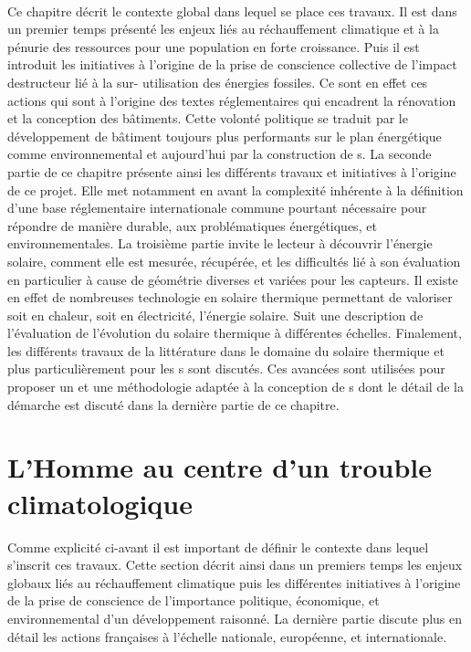\paragraph{} %
Ce chapitre décrit le contexte global dans lequel se place ces travaux. Il est dans un
premier temps présenté les enjeux liés au réchauffement climatique et à la pénurie des
ressources pour une population en forte croissance. Puis il est introduit les initiatives
à l’origine de la prise de conscience collective de l’impact destructeur lié à la sur-
utilisation des énergies fossiles. Ce sont en effet ces actions qui sont à l’origine des
textes réglementaires qui encadrent la rénovation et la conception des bâtiments. Cette
volonté politique se traduit par le développement de bâtiment toujours plus performants
sur le plan énergétique comme environnemental et aujourd’hui par la construction de
s. La seconde partie de ce chapitre présente ainsi les différents travaux et
initiatives à l’origine de ce projet. Elle met notamment en avant la complexité inhérente
à la définition d’une base réglementaire internationale commune pourtant nécessaire pour
répondre de manière durable, aux problématiques énergétiques, et environnementales. La
troisième partie invite le lecteur à découvrir l’énergie solaire, comment elle est
mesurée, récupérée, et les difficultés lié à son évaluation en particulier à cause de
géométrie diverses et variées pour les capteurs. Il existe en effet de nombreuses
technologie en solaire thermique permettant de valoriser soit en chaleur, soit en
électricité, l’énergie solaire. Suit une description de l’évaluation de l’évolution du
solaire thermique à différentes échelles. Finalement, les différents travaux de la
littérature dans le domaine du solaire thermique et plus particulièrement pour les
s sont discutés. Ces avancées sont utilisées pour proposer un  et une
méthodologie adaptée à la conception de s dont le détail de la démarche est
discuté dans la dernière partie de ce chapitre.



\section{L’Homme au centre d’un trouble climatologique} %
\label{sec:l_homme_au_centre_d_un_trouble_climatologique}
Comme explicité ci-avant il est important de définir le contexte dans lequel s’inscrit ces
travaux. Cette section décrit ainsi dans un premiers temps les enjeux globaux liés au
réchauffement climatique puis les différentes initiatives à l’origine de la prise de
conscience de l’importance politique, économique, et environnemental d’un développement
raisonné. La dernière partie discute plus en détail les actions françaises à l’échelle
nationale, européenne, et internationale.

